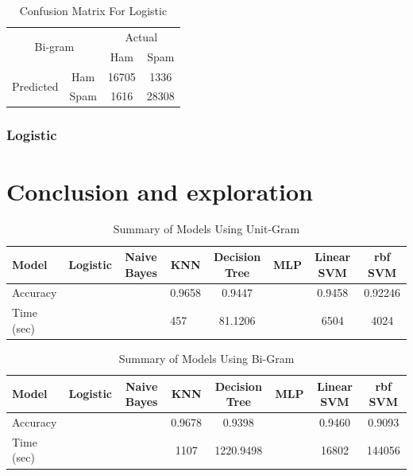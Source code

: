 \documentclass[12pt]{article}
\begin{document}
\begin{table}[H]
\begin{floatrow}
{\begin{subtable}{.5\textwidth}
\begin{tabular}{@{}|c|c|c|c|@{}}
					\multicolumn{2}{|c|}{\multirow{2}{*}{Bi-gram}} & \multicolumn{2}{c|}{Actual} \\ \cmidrule(l){3-4} 
					\multicolumn{2}{|c|}{}                        & Ham          & Spam         \\ \midrule
					\multirow{2}{*}{Predicted}       & Ham        & 16705        & 1336          \\ \cmidrule(l){2-4} 
					& Spam       & 1616          & 28308        \\ \bottomrule
				\end{tabular}
			\end{subtable}
		}{  
			\caption{Confusion Matrix For Logistic}  
			\label{Confusion_Logistic}  
		}  
	\end{floatrow}
\end{table} 




\subsubsection{Logistic}


\section{Conclusion and exploration}


\begin{table}[H]
	\centering
	\caption{Summary of Models Using Unit-Gram}
	\label{Summary-one-gram}
	\begin{tabular}{lccccccc}
		\hline
		Model      & Logistic             & Naive Bayes          & KNN                     & Decision Tree & MLP                  & Linear SVM & rbf SVM \\ \hline
		Accuracy   &                      &                      & 0.9658                  & 0.9447        &                      & 0.9458     & 0.92246 \\
		Time (sec) & \multicolumn{1}{l}{} & \multicolumn{1}{l}{} & \multicolumn{1}{l}{457} & 81.1206       & \multicolumn{1}{l}{} & 6504       & 4024    \\ \hline
	\end{tabular}
\end{table}


\begin{table}[H]
	\centering
	\caption{Summary of Models Using Bi-Gram}
	\label{Summary-bi-gram}
	\begin{tabular}{lccccccc}
		\hline
		Model      & Logistic & Naive Bayes & KNN    & Decision Tree & MLP & Linear SVM & rbf SVM \\ \hline
		Accuracy   &          &             & 0.9678 & 0.9398        &     & 0.9460     & 0.9093  \\
		Time (sec) &          &             & 1107   & 1220.9498     &     & 16802      & 144056  \\ \hline
	\end{tabular}
\end{table}
\end{document}
